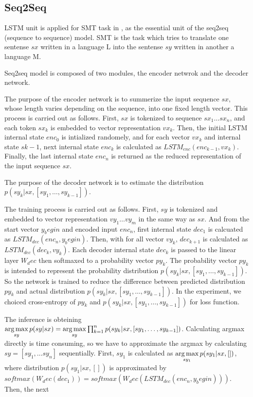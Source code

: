\documentclass[senior,final,11pt]{iscs-thesis}
\newcommand{\argmax}{\mathop{\rm arg\,max}\limits}
\begin{document}
\subsection{Seq2Seq}

LSTM unit is applied for SMT task in \cite{seq2seq}, as the essential unit of the seq2seq (sequence to sequence) model.
SMT is the task which tries to translate one sentense $sx$ written in a language L into the sentense $sy$ written in another a language M.

Seq2seq model is composed of two modules, the encoder netwrok and the decoder network.

The purpose of the encoder network is to summerize the input sequence $sx$, whose length varies depending on the sequence, into one fixed length vector.
This process is carried out as follows. 
First, $sx$ is tokenized to sequence $sx_{1} \dots sx_{n}$, and each token $sx_{k}$ is embedded to vector representation $vx_{k}$. 
Then, the initial LSTM internal state $enc_0$ is intialized randomely, 
and for each vector $vx_{k}$ and internal state $s{k-1}$, next internal state $enc_{k}$ is calculated as $ LSTM_{enc}(enc_{k-1},vx_{k}) $.
Finally, the last internal state $ enc_{n}$ is returned as the reduced representation of the input sequence $sx$.

The purpose of the decoder network is to estimate the distribution $ p(sy_k|sx,[sy_1,\dots,sy_{k-1}]) $. 

The training process is carried out as follows. 
First, $sy$ is tokenized and embedded to vector representation $vy_{1} \dots vy_{m}$ in the same way as $sx$.
And from the start vector $y_begin$ and encoded input $ enc_{n} $, first internal state $ dec_{1}$ is calcuated as $ LSTM_{dec}(enc_{n},y_begin) $.
Then, with for all vector $vy_{k}$, $dec_{k+1}$ is calculated as $ LSTM_{dec}(dec_{k},vy_{k}) $.
Each decoder internal state $ dec_{k} $ is passed to the linear layer $ W_dec $ then softmaxed to a probability vector $ py_{k} $.
The probability vector $ py_{k} $ is intended to represent the probability distribution $ p(sy_k|sx,[sy_1,\dots,sy_{k-1}]) $.
So the network is trained to reduce the difference between predicted distribution $ py_{k} $ and actual distribution $ p(sy_k|sx,[sy_1,\dots,sy_{k-1}]) $.
In the experiment, we choiced cross-entropy of $ py_{k} $ and $ p(sy_k|sx,[sy_1,\dots,sy_{k-1}]) $ for loss function.

The inference is obteining $ \argmax_{sy} p(sy|sx) = \argmax_{sy} \prod_{k=1}^n p(sy_k|sx,[sy_1,\dots,sy_{k-1}]) $.
Calculating argmax directly is time consuming, so we have to approximate the argmax by calculating $sy = [sy_1, \dots sy_n]$ sequentially.
First, $sy_1$ is calculated as $ \argmax_{sy_1} p(sy_1|sx,[]) $, where distribution $ p(sy_1|sx,[]) $ is approximated by 
$ softmax(W_dec(dec_{1})) = softmax(W_dec(LSTM_{dec}(enc_{n},y_begin))) $. Then, the next 
\end{document}
